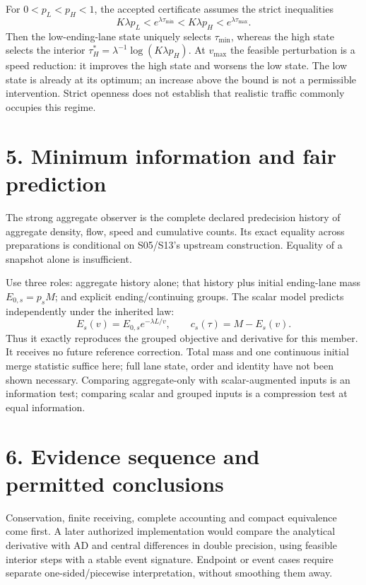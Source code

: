 \documentclass[11pt]{article}
\begin{document}
For $0<p_L<p_H<1$, the accepted certificate assumes the strict inequalities
\begin{equation}
 K\lambda p_L<e^{\lambda\tau_{\min}}
 <K\lambda p_H<e^{\lambda\tau_{\max}}.
 \label{eq:regime}
\end{equation}
Then the low-ending-lane state uniquely selects $\tau_{\min}$, whereas the high
state selects the interior $\tau_H^*=\lambda^{-1}\log(K\lambda p_H)$.
At $v_{\max}$ the feasible perturbation is a speed reduction: it improves the
high state and worsens the low state. The low state is already at its optimum;
an increase above the bound is not a permissible intervention. Strict openness
does not establish that realistic traffic commonly occupies this regime.

\newpage
\section*{5. Minimum information and fair prediction}
The strong aggregate observer is the complete declared predecision history of
aggregate density, flow, speed and cumulative counts. Its exact equality across
preparations is conditional on S05/S13's upstream construction. Equality of a
snapshot alone is insufficient.

Use three roles: aggregate history alone; that history plus initial ending-lane
mass $E_{0,s}=p_sM$; and explicit ending/continuing groups. The scalar model
predicts independently under the inherited law:
\begin{equation}
 E_s(v)=E_{0,s}e^{-\lambda L/v},\qquad c_s(\tau)=M-E_s(v).
 \label{eq:compression}
\end{equation}
Thus it exactly reproduces the grouped objective and derivative for this member.
It receives no future reference correction. Total mass and one continuous
initial merge statistic suffice here; full lane state, order and identity have
not been shown necessary. Comparing aggregate-only with scalar-augmented inputs
is an information test; comparing scalar and grouped inputs is a compression
test at equal information.

\section*{6. Evidence sequence and permitted conclusions}
Conservation, finite receiving, complete accounting and compact equivalence
come first. A later authorized implementation would compare the analytical
derivative with AD and central differences in double precision, using feasible
interior steps with a stable event signature. Endpoint or event cases require
separate one-sided/piecewise interpretation, without smoothing them away.
\end{document}
